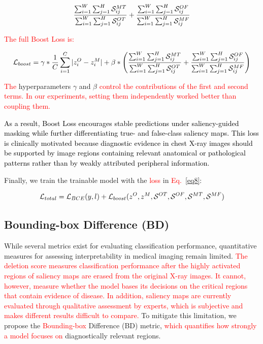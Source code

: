 \documentclass[preprint,7pt, a4paper]{elsarticle}
\begin{document}
\begin{equation}
    \textcolor{black}{\frac{\sum_{i=1}^W \sum_{j=1}^H \mathcal{S}_{ij}^{MT}}{\sum_{i=1}^W\sum_{j=1}^H \mathcal{S}_{ij}^{OT}} + \frac{\sum_{i=1}^W \sum_{j=1}^H \mathcal{S}_{ij}^{OF}}{\sum_{i=1}^W \sum_{j=1}^H \mathcal{S}_{ij}^{MF}}}
    \label{eq10}
\end{equation}

\textcolor{red}{The full Boost Loss is:}

\begin{equation}
    \textcolor{black}{\mathcal{L}_{boost} = \gamma * \frac{1}{C} \sum_{i=1}^C |z^O_i - z^M_i| + \beta * \left(\frac{\sum_{i=1}^W \sum_{j=1}^H \mathcal{S}_{ij}^{MT}}{\sum_{i=1}^W\sum_{j=1}^H \mathcal{S}_{ij}^{OT}} + \frac{\sum_{i=1}^W \sum_{j=1}^H \mathcal{S}_{ij}^{OF}}{\sum_{i=1}^W \sum_{j=1}^H \mathcal{S}_{ij}^{MF}}\right)}
\end{equation}

\textcolor{red}{The} hyperparameters $\gamma$ and $\beta$ \textcolor{red}{control the contributions of the first and second terms. In our experiments, setting them independently worked better than coupling them.}

\textcolor{black}{As a result, Boost Loss encourages stable predictions under saliency-guided masking while further differentiating true- and false-class saliency maps. This loss is clinically motivated because diagnostic evidence in chest X-ray images should be supported by image regions containing relevant anatomical or pathological patterns rather than by weakly attributed peripheral information.}

Finally, we train the trainable model with the \textcolor{red}{loss} in \textcolor{red}{Eq.~\ref{eq8}}: 

\begin{equation}
    \textcolor{black}{\mathcal{L}_{total} = \mathcal{L}_{BCE}(y, l) + \mathcal{L}_{boost}(z^O, z^M, \mathcal{S}^{OT}, \mathcal{S}^{OF}, \mathcal{S}^{MT}, \mathcal{S}^{MF})}
    \label{eq8}
\end{equation}

\subsection{Bounding-box Difference (BD)}
\label{m5}

While several metrics exist for evaluating classification performance, quantitative measures for assessing interpretability in medical imaging remain limited. \textcolor{red}{The deletion score \cite{84} measures classification performance after the highly activated regions of saliency maps are erased from the original X-ray images. It cannot, however, measure whether the model bases its decisions on the critical regions that contain evidence of disease. In addition, saliency maps are currently evaluated through qualitative assessment by experts, which is subjective and makes different results difficult to compare.} To mitigate this limitation, we propose the \textcolor{red}{Bounding-box} Difference (BD) metric, \textcolor{red}{which quantifies how strongly a model focuses on} diagnostically relevant regions.
\end{document}
